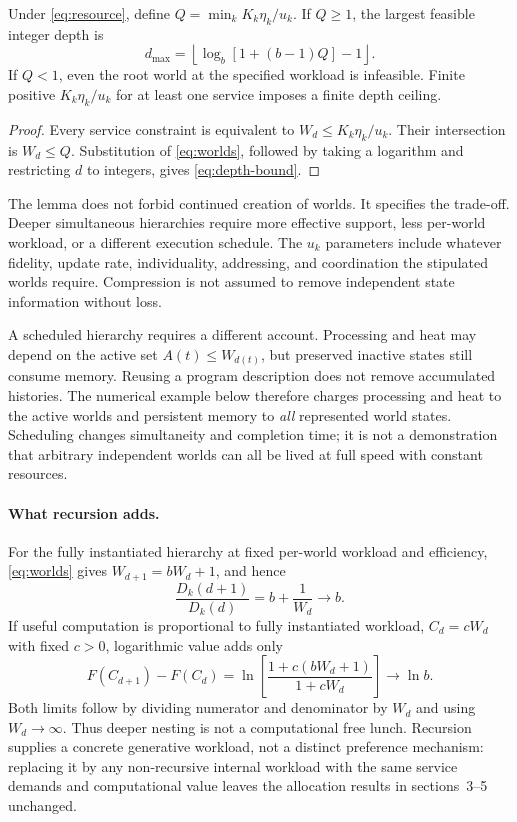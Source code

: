 \begin{lemma}
\label{prop:depth}
Under \cref{eq:resource}, define $Q=\min_k K_k\eta_k/u_k$. If $Q\geq1$, the largest feasible integer depth is
\begin{equation}
 d_{\max}=\left\lfloor\log_b[1+(b-1)Q]-1\right\rfloor.
 \label{eq:depth-bound}
\end{equation}
If $Q<1$, even the root world at the specified workload is infeasible. Finite positive $K_k\eta_k/u_k$ for at least one service imposes a finite depth ceiling.
\end{lemma}
\begin{proof}
Every service constraint is equivalent to $W_d\leq K_k\eta_k/u_k$. Their intersection is $W_d\leq Q$. Substitution of \cref{eq:worlds}, followed by taking a logarithm and restricting $d$ to integers, gives \cref{eq:depth-bound}.
\end{proof}

The lemma does not forbid continued creation of worlds. It specifies the trade-off. Deeper simultaneous hierarchies require more effective support, less per-world workload, or a different execution schedule. The $u_k$ parameters include whatever fidelity, update rate, individuality, addressing, and coordination the stipulated worlds require. Compression is not assumed to remove independent state information without loss.

A scheduled hierarchy requires a different account. Processing and heat may depend on the active set $A(t)\leq W_{d(t)}$, but preserved inactive states still consume memory. Reusing a program description does not remove accumulated histories. The numerical example below therefore charges processing and heat to the active worlds and persistent memory to \emph{all} represented world states. Scheduling changes simultaneity and completion time; it is not a demonstration that arbitrary independent worlds can all be lived at full speed with constant resources.


\paragraph{What recursion adds.}
For the fully instantiated hierarchy at fixed per-world workload and efficiency, \cref{eq:worlds} gives
$W_{d+1}=bW_d+1$, and hence
\begin{equation}
 \frac{D_k(d+1)}{D_k(d)}=b+\frac{1}{W_d}\longrightarrow b.
 \label{eq:recursion-cost}
\end{equation}
If useful computation is proportional to fully instantiated workload,
$C_d=cW_d$ with fixed $c>0$, logarithmic value adds only
\begin{equation}
 F(C_{d+1})-F(C_d)
 =\ln\!\left[\frac{1+c(bW_d+1)}{1+cW_d}\right]
 \longrightarrow\ln b.
 \label{eq:recursion-value}
\end{equation}
Both limits follow by dividing numerator and denominator by $W_d$ and
using $W_d\to\infty$. Thus deeper nesting is not a computational free
lunch. Recursion supplies a concrete generative workload, not a distinct
preference mechanism: replacing it by any non-recursive internal workload
with the same service demands and computational value leaves the allocation
results in sections~3--5 unchanged.

